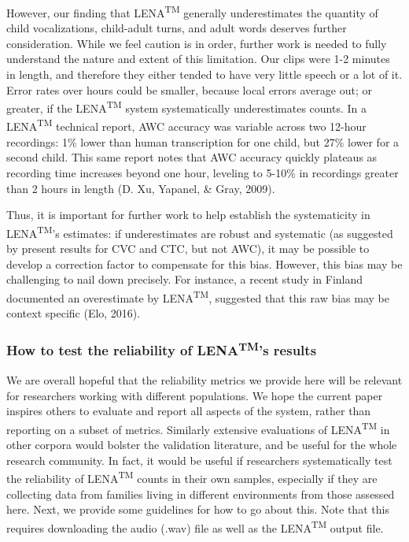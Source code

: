 \documentclass[english,floatsintext,man]{apa6}
\begin{document}
However, our finding that LENA\textsuperscript{TM} generally
underestimates the quantity of child vocalizations, child-adult turns,
and adult words deserves further consideration. While we feel caution is
in order, further work is needed to fully understand the nature and
extent of this limitation. Our clips were 1-2 minutes in length, and
therefore they either tended to have very little speech or a lot of it.
Error rates over hours could be smaller, because local errors average
out; or greater, if the LENA\textsuperscript{TM} system systematically
underestimates counts. In a LENA\textsuperscript{TM} technical report,
AWC accuracy was variable across two 12-hour recordings: 1\% lower than
human transcription for one child, but 27\% lower for a second child.
This same report notes that AWC accuracy quickly plateaus as recording
time increases beyond one hour, leveling to 5-10\% in recordings greater
than 2 hours in length (D. Xu, Yapanel, \& Gray, 2009).

Thus, it is important for further work to help establish the
systematicity in LENA\textsuperscript{TM}'s estimates: if underestimates
are robust and systematic (as suggested by present results for CVC and
CTC, but not AWC), it may be possible to develop a correction factor to
compensate for this bias. However, this bias may be challenging to nail
down precisely. For instance, a recent study in Finland documented an
overestimate by LENA\textsuperscript{TM}, suggested that this raw bias
may be context specific (Elo, 2016).

\subsubsection{\texorpdfstring{How to test the reliability of
LENA\textsuperscript{TM}'s
results}{How to test the reliability of LENATM's results}}\label{how-to-test-the-reliability-of-lenatms-results}

We are overall hopeful that the reliability metrics we provide here will
be relevant for researchers working with different populations. We hope
the current paper inspires others to evaluate and report all aspects of
the system, rather than reporting on a subset of metrics. Similarly
extensive evaluations of LENA\textsuperscript{TM} in other corpora would
bolster the validation literature, and be useful for the whole research
community. In fact, it would be useful if researchers systematically
test the reliability of LENA\textsuperscript{TM} counts in their own
samples, especially if they are collecting data from families living in
different environments from those assessed here. Next, we provide some
guidelines for how to go about this. Note that this requires downloading
the audio (.wav) file as well as the LENA\textsuperscript{TM} output
file.
\end{document}
